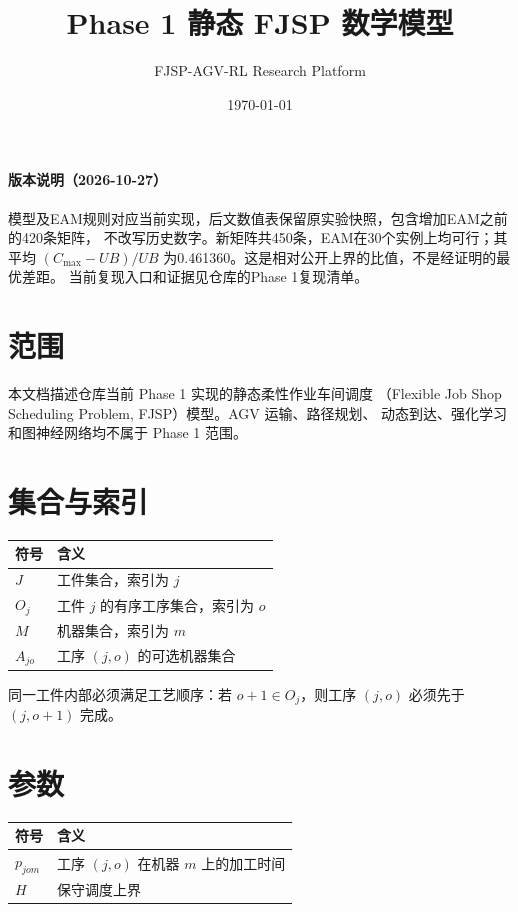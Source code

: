 ﻿\documentclass[11pt]{ctexart}
\title{Phase 1 静态 FJSP 数学模型}
\author{FJSP-AGV-RL Research Platform}
\date{\today}
\begin{document}
\maketitle

\paragraph{版本说明（2026-10-27）}
模型及EAM规则对应当前实现，后文数值表保留原实验快照，包含增加EAM之前的420条矩阵，
不改写历史数字。新矩阵共450条，EAM在30个实例上均可行；其平均
$(C_{\max}-UB)/UB$ 为0.461360。这是相对公开上界的比值，不是经证明的最优差距。
当前复现入口和证据见仓库的Phase 1复现清单。

\section{范围}

本文档描述仓库当前 Phase 1 实现的静态柔性作业车间调度
（Flexible Job Shop Scheduling Problem, FJSP）模型。AGV 运输、路径规划、
动态到达、强化学习和图神经网络均不属于 Phase 1 范围。

\section{集合与索引}

\begin{table}[h]
\centering
\begin{tabular}{ll}
\toprule
符号 & 含义 \\
\midrule
$J$ & 工件集合，索引为 $j$ \\
$O_j$ & 工件 $j$ 的有序工序集合，索引为 $o$ \\
$M$ & 机器集合，索引为 $m$ \\
$A_{jo}$ & 工序 $(j,o)$ 的可选机器集合 \\
\bottomrule
\end{tabular}
\end{table}

同一工件内部必须满足工艺顺序：若 $o+1 \in O_j$，则工序 $(j,o)$ 必须先于
$(j,o+1)$ 完成。

\section{参数}

\begin{table}[h]
\centering
\begin{tabular}{ll}
\toprule
符号 & 含义 \\
\midrule
$p_{jom}$ & 工序 $(j,o)$ 在机器 $m$ 上的加工时间 \\
$H$ & 保守调度上界 \\
\bottomrule
\end{tabular}
\end{table}
\end{document}
